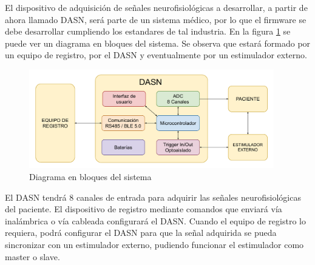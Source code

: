 \documentclass[
11pt, %
codirector, %
]{charter}
\begin{document}
El dispositivo de adquisición de señales neurofisiológicas a desarrollar, a partir de ahora llamado DASN, será parte de un sistema médico, por lo que el firmware se debe desarrollar cumpliendo los estandares de tal industria. En la figura \ref{fig:diagBloquesSistema} se puede ver un diagrama en bloques del sistema. Se observa que estará formado por un equipo de registro, por el DASN y eventualmente por un estimulador externo. 

\begin{figure}[htpb]
\centering 
\includegraphics[width=0.95\textwidth]{./Figuras/DiagramaEnBloquesDASN.pdf}
\caption{Diagrama en bloques del sistema}
\label{fig:diagBloquesSistema}
\end{figure}

El DASN tendrá 8 canales de entrada para adquirir las señales neurofisiológicas del paciente. El dispositivo de registro mediante comandos que enviará vía inalámbrica o vía cableada configurará el DASN. Cuando el equipo de registro lo requiera, podrá configurar el DASN para que la señal adquirida se pueda sincronizar con un estimulador externo, pudiendo funcionar el estimulador como master o slave.
\end{document}
